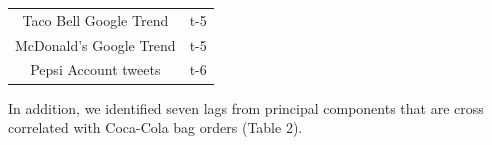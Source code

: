 \documentclass[12pt,oneside]{chicagocapstone}
\begin{document}
\begin{longtable}[]{@{}cc@{}}
\begin{minipage}[t]{0.44\columnwidth}\centering
Taco Bell Google Trend\strut
\end{minipage} & \begin{minipage}[t]{0.39\columnwidth}\centering
t-5\strut
\end{minipage}\tabularnewline
\begin{minipage}[t]{0.44\columnwidth}\centering
McDonald's Google Trend\strut
\end{minipage} & \begin{minipage}[t]{0.39\columnwidth}\centering
t-5\strut
\end{minipage}\tabularnewline
\begin{minipage}[t]{0.44\columnwidth}\centering
Pepsi Account tweets\strut
\end{minipage} & \begin{minipage}[t]{0.39\columnwidth}\centering
t-6\strut
\end{minipage}\tabularnewline
\bottomrule
\end{longtable}
In addition, we identified seven lags from principal components that are cross correlated with Coca-Cola bag orders (Table 2).
\end{document}
